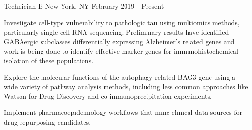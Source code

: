 %
%
%

\vspace*{0.35cm}

\begin{cventries}

    {Technician B}
    {New York, NY}
    {February 2019 - Present}
    {\begin{cvitems}
        \item{Investigate cell-type vulnerability to pathologic tau using multiomics
            methods, particularly single-cell RNA sequencing. Preliminary results have
            identified GABAergic subclasses differentially expressing Alzheimer's
            related genes and work is being done to identify effective marker genes
            for immunohistochemical isolation of these populations.\vspace*{0.1cm}}
        \item{Explore the molecular functions of the autophagy-related BAG3 gene using
            a wide variety of pathway analysis methods, including less common approaches
            like Watson for Drug Discovery and co-immunoprecipitation experiments.
            \vspace*{0.1cm}}
        \item{Implement pharmacoepidemiology workflows that mine clinical data sources
            for drug repurposing candidates.}
    \end{cvitems}}
    \vspace*{0.2cm}


\end{cventries}
